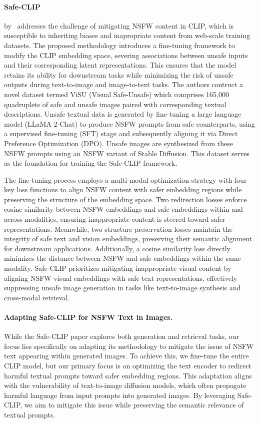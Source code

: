 \paragraph{Safe-CLIP} by~\citet{poppi2025safe} addresses the challenge of mitigating NSFW content in CLIP, which  is susceptible to inheriting biases and inapropriate content from web-scale training datasets. The proposed methodology introduces a fine-tuning framework to modify the CLIP embedding space, severing associations between unsafe inputs and their corresponding latent representations. This ensures that the model retains its ability for downstream tasks while minimizing the risk of unsafe outputs during text-to-image and image-to-text tasks. The authors contruct a novel dataset termed ViSU (Visual Safe-Unsafe) which comprises 165,000 quadruplets of safe and unsafe images paired with corresponding textual descriptions. Unsafe textual data is generated by fine-tuning a large language model (LLaMA 2-Chat) to produce NSFW prompts from safe counterparts, using a supervised fine-tuning (SFT) stage and subsequently aligning it via Direct Preference Optimization (DPO). Unsafe images are synthesized from these NSFW prompts using an NSFW variant of Stable Diffusion. This dataset serves as the foundation for training the Safe-CLIP framework.

The fine-tuning process employs a multi-modal optimization strategy with four key loss functions to align NSFW content with safer embedding regions while preserving the structure of the embedding space. Two redirection losses enforce cosine similarity between NSFW embeddings and safe embeddings within and across modalities, ensuring inappropriate content is steered toward safer representations. Meanwhile, two structure preservation losses maintain the integrity of safe text and vision embeddings, preserving their semantic alignment for downstream applications. Additionally, a cosine similarity loss directly minimizes the distance between NSFW and safe embeddings within the same modality. Safe-CLIP prioritizes mitigating inappropriate visual content by aligning NSFW visual embeddings with safe text representations, effectively suppressing unsafe image generation in tasks like text-to-image synthesis and cross-modal retrieval.

\paragraph{Adapting Safe-CLIP for NSFW Text in Images.}
While the Safe-CLIP paper explores both generation and retrieval tasks, our focus lies specifically on adapting its methodology to mitigate the issue of NSFW text appearing within generated images. To achieve this, we fine-tune the entire CLIP model, but our primary focus is on optimizing the text encoder to redirect harmful textual prompts toward safer embedding regions. This adaptation aligns with the vulnerability of text-to-image diffusion models, which often propagate harmful language from input prompts into generated images. By leveraging Safe-CLIP, we aim to mitigate this issue while preserving the semantic relevance of textual prompts.

